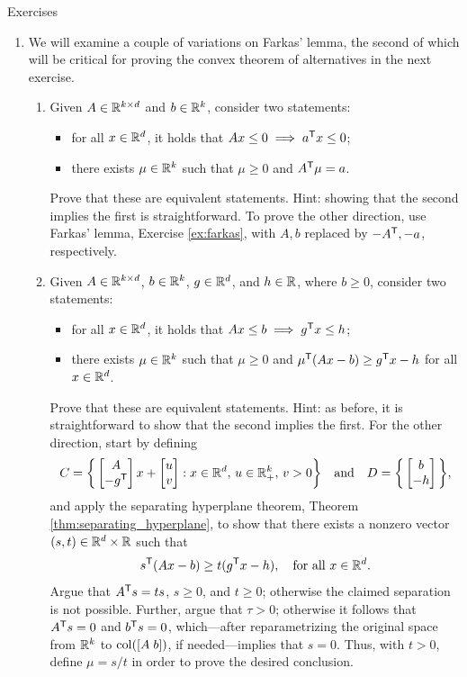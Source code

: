 \begin{xcb}{Exercises}
\begin{enumerate}[label=\thechapter.\arabic*]
\item \label{ex:farkas_variations}
  We will examine a couple of variations on Farkas' lemma, the second of which 
  will be critical for proving the convex theorem of alternatives in the next
  exercise.      

\begin{enumerate}[label=\alph*.]
\item Given $A \in \mathbb{R}^{k \times d}$ and $b \in \mathbb{R}^k$, consider two statements: 
  \begin{itemize}
  \item for all $x \in \mathbb{R}^d$, it holds that $Ax \leq 0 \implies a^{\mathsf{T}} x \leq 0$;  
  \item there exists $\mu \in \mathbb{R}^k$ such that $\mu \geq 0$ and $A^{\mathsf{T}} \mu = 
    a$.
  \end{itemize}
  Prove that these are equivalent statements. Hint: showing that the second  
  implies the first is straightforward. To prove the other direction, use
  Farkas' lemma, Exercise \ref{ex:farkas}, with $A,b$ replaced by $-A^{\mathsf{T}}, -a$,
  respectively.        

\item Given $A \in \mathbb{R}^{k \times d}$, $b \in \mathbb{R}^k$, $g \in \mathbb{R}^d$, and $h \in \mathbb{R}$,
  where $b \geq 0$, consider two statements:  
  \begin{itemize}
  \item for all $x \in \mathbb{R}^d$, it holds that $Ax \leq b \implies g^{\mathsf{T}} x \leq h$;  
  \item there exists $\mu \in \mathbb{R}^k$ such that $\mu \geq 0$ and $\mu^{\mathsf{T}} (Ax - b) 
    \geq g^{\mathsf{T}} x - h$ for all $x \in \mathbb{R}^d$.
  \end{itemize}
  Prove that these are equivalent statements. Hint: as before, it is
  straightforward to show that the second implies the first. For the other
  direction, start by defining
  \[
  C = \bigg\{ \begin{bmatrix} A \\ -g^{\mathsf{T}} \end{bmatrix} x + \begin{bmatrix} u \\     
    v \end{bmatrix} : x \in \mathbb{R}^d, \, u \in \mathbb{R}^k_+, \, v > 0 \bigg\} 
  \quad \text{and} \quad D = \bigg\{ \begin{bmatrix} b \\ -h \end{bmatrix} 
  \bigg\},
  \] 
  and apply the separating hyperplane theorem, Theorem
  \ref{thm:separating_hyperplane}, to show that there exists a nonzero vector
  $(s,t) \in \mathbb{R}^d \times \mathbb{R}$ such that 
  \[
  s^{\mathsf{T}} (Ax - b) \geq t (g^{\mathsf{T}} x - h), \quad \text{for all $x \in \mathbb{R}^d$}.
  \]
  Argue that $A^{\mathsf{T}} s = ts$, $s \geq 0$, and $t \geq 0$; otherwise the claimed
  separation is not possible. Further, argue that $\tau > 0$; otherwise it
  follows that $A^{\mathsf{T}} s = 0$ and $b^{\mathsf{T}} s = 0$, which---after reparametrizing the  
  original space from $\mathbb{R}^k$ to $\operatorname{col}([A \; b])$, if needed---implies that $s = 
  0$. Thus, with $t > 0$, define $\mu = s/t$ in order to prove the desired
  conclusion.           
\end{enumerate}


\end{enumerate}
\end{xcb}
